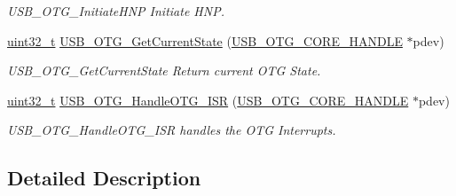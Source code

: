 \begin{DoxyCompactItemize}
\begin{DoxyCompactList}\small\item\em U\-S\-B\-\_\-\-O\-T\-G\-\_\-\-Initiate\-H\-N\-P Initiate H\-N\-P. \end{DoxyCompactList}\item 
\hyperlink{stdint_8h_a435d1572bf3f880d55459d9805097f62}{uint32\-\_\-t} \hyperlink{group___u_s_b___o_t_g___private___functions_ga937ad5a580e93fe7a48139e566e78d0d}{U\-S\-B\-\_\-\-O\-T\-G\-\_\-\-Get\-Current\-State} (\hyperlink{group___u_s_b___c_o_r_e___exported___types_gaf76054c11eb8a3367907aad7ae700e80}{U\-S\-B\-\_\-\-O\-T\-G\-\_\-\-C\-O\-R\-E\-\_\-\-H\-A\-N\-D\-L\-E} $\ast$pdev)
\begin{DoxyCompactList}\small\item\em U\-S\-B\-\_\-\-O\-T\-G\-\_\-\-Get\-Current\-State Return current O\-T\-G State. \end{DoxyCompactList}\item 
\hyperlink{stdint_8h_a435d1572bf3f880d55459d9805097f62}{uint32\-\_\-t} \hyperlink{group___u_s_b___o_t_g___private___functions_gad60a04348d7620e6ed4fce5e0ddb3837}{U\-S\-B\-\_\-\-O\-T\-G\-\_\-\-Handle\-O\-T\-G\-\_\-\-I\-S\-R} (\hyperlink{group___u_s_b___c_o_r_e___exported___types_gaf76054c11eb8a3367907aad7ae700e80}{U\-S\-B\-\_\-\-O\-T\-G\-\_\-\-C\-O\-R\-E\-\_\-\-H\-A\-N\-D\-L\-E} $\ast$pdev)
\begin{DoxyCompactList}\small\item\em U\-S\-B\-\_\-\-O\-T\-G\-\_\-\-Handle\-O\-T\-G\-\_\-\-I\-S\-R handles the O\-T\-G Interrupts. \end{DoxyCompactList}\end{DoxyCompactItemize}


\subsection{Detailed Description}


